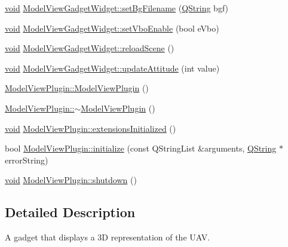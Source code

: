 \begin{DoxyCompactItemize}
\hyperlink{group___u_a_v_objects_plugin_ga444cf2ff3f0ecbe028adce838d373f5c}{void} \hyperlink{group___model_view_plugin_gab29343cadc70576f4b7d8f91dd1a3863}{\-Model\-View\-Gadget\-Widget\-::set\-Bg\-Filename} (\hyperlink{group___u_a_v_objects_plugin_gab9d252f49c333c94a72f97ce3105a32d}{\-Q\-String} bgf)
\item 
\hyperlink{group___u_a_v_objects_plugin_ga444cf2ff3f0ecbe028adce838d373f5c}{void} \hyperlink{group___model_view_plugin_ga9ae7a41d63686c2ec25ee02e08ffed21}{\-Model\-View\-Gadget\-Widget\-::set\-Vbo\-Enable} (bool e\-Vbo)
\item 
\hyperlink{group___u_a_v_objects_plugin_ga444cf2ff3f0ecbe028adce838d373f5c}{void} \hyperlink{group___model_view_plugin_gad031b977be54f4bd5243fa4d6f846f68}{\-Model\-View\-Gadget\-Widget\-::reload\-Scene} ()
\item 
\hyperlink{group___u_a_v_objects_plugin_ga444cf2ff3f0ecbe028adce838d373f5c}{void} \hyperlink{group___model_view_plugin_gaa7c16fd0b59ded87f8d136fd72680dca}{\-Model\-View\-Gadget\-Widget\-::update\-Attitude} (int value)
\item 
\hyperlink{group___model_view_plugin_gafbc74cc8c17048cddb875add75e65cad}{\-Model\-View\-Plugin\-::\-Model\-View\-Plugin} ()
\item 
\hyperlink{group___model_view_plugin_gac1d370684cf595a557c80ee2d6572e39}{\-Model\-View\-Plugin\-::$\sim$\-Model\-View\-Plugin} ()
\item 
\hyperlink{group___u_a_v_objects_plugin_ga444cf2ff3f0ecbe028adce838d373f5c}{void} \hyperlink{group___model_view_plugin_gaf0ae0222c081f943759de1e0697df04e}{\-Model\-View\-Plugin\-::extensions\-Initialized} ()
\item 
bool \hyperlink{group___model_view_plugin_ga6f9214b4e1b72063475d8351046df6bb}{\-Model\-View\-Plugin\-::initialize} (const \-Q\-String\-List \&arguments, \hyperlink{group___u_a_v_objects_plugin_gab9d252f49c333c94a72f97ce3105a32d}{\-Q\-String} $\ast$error\-String)
\item 
\hyperlink{group___u_a_v_objects_plugin_ga444cf2ff3f0ecbe028adce838d373f5c}{void} \hyperlink{group___model_view_plugin_gad3a367fabe72d1e3a0063267d0170df9}{\-Model\-View\-Plugin\-::shutdown} ()
\end{DoxyCompactItemize}


\subsection{\-Detailed \-Description}
\-A gadget that displays a 3\-D representation of the \-U\-A\-V. 

